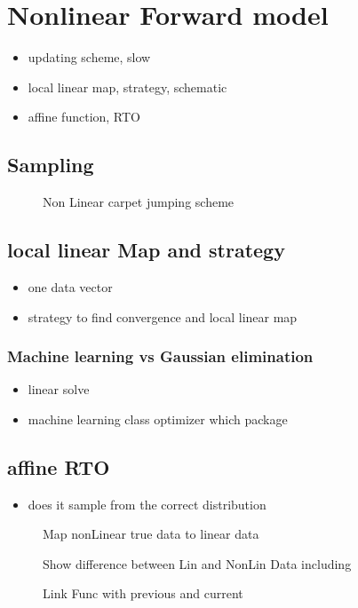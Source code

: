 \chapter{Nonlinear Forward model}
\begin{itemize}
	\item updating scheme, slow
	\item local linear map, strategy, schematic
	\item affine function, RTO
\end{itemize}

\section{Sampling}

\begin{figure}[h]
	\centering
	\scalebox{0.66}{}
	\caption[]{Non Linear carpet jumping scheme}
	\label{fig:Results}
\end{figure}

\section{local linear Map and strategy}
\begin{itemize}
	\item one data vector
	\item strategy to find convergence and local linear map
\end{itemize}
\subsection{Machine learning vs Gaussian elimination}
\begin{itemize}
	\item linear solve
	\item machine learning class optimizer which package
\end{itemize}
\section{affine RTO}

\begin{itemize}
	\item does it sample from the correct distribution
\end{itemize}

\begin{figure}[h]
	\centering
	\scalebox{0.66}{}
	\caption[]{Map nonLinear true data to linear data}
	\label{fig:Results}
\end{figure}

\begin{figure}[h]
	\centering
	\scalebox{0.66}{}
	\caption[]{Show difference between Lin and NonLin Data including}
	\label{fig:Results}
\end{figure}

\begin{figure}[h]
	\centering
	\scalebox{0.66}{}
	\caption[]{Link Func with previous and current}
	\label{fig:Results}
\end{figure}